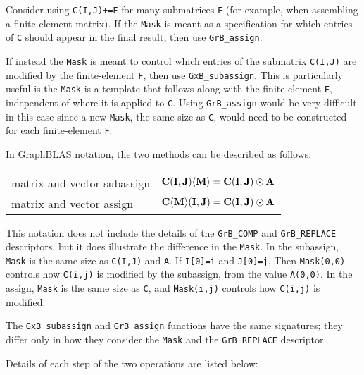 \documentclass[12pt]{article}
\begin{document}
{Consider using \verb'C(I,J)+=F' for many submatrices \verb'F' (for example,
when assembling a finite-element matrix).  If the \verb'Mask' is meant as a
specification for which entries of \verb'C' should appear in the final result,
then use \verb'GrB_assign'.

If instead the \verb'Mask' is meant to control which entries of the submatrix
\verb'C(I,J)' are modified by the finite-element \verb'F', then use
\verb'GxB_subassign'.  This is particularly useful is the \verb'Mask' is a
template that follows along with the finite-element \verb'F', independent of
where it is applied to \verb'C'.  Using \verb'GrB_assign' would be very
difficult in this case since a new \verb'Mask', the same size as \verb'C',
would need to be constructed for each finite-element \verb'F'.

In GraphBLAS notation, the two methods can be described as follows:

\vspace{0.05in}
\begin{tabular}{ll}
\hline
matrix and vector subassign & ${\bf C(I,J) \langle M \rangle}  = {\bf C(I,J)} \odot {\bf A}$ \\
matrix and vector    assign & ${\bf C \langle M \rangle (I,J)} = {\bf C(I,J)} \odot {\bf A}$ \\
\hline
\end{tabular}
\vspace{0.05in}

This notation does not include the details of the \verb'GrB_COMP' and
\verb'GrB_REPLACE' descriptors, but it does illustrate the difference in the
\verb'Mask'.  In the subassign, \verb'Mask' is the same size as \verb'C(I,J)'
and \verb'A'.  If \verb'I[0]=i' and \verb'J[0]=j', Then \verb'Mask(0,0)'
controls how \verb'C(i,j)' is modified by the subassign, from the value
\verb'A(0,0)'.  In the assign, \verb'Mask' is the same size as \verb'C', and
\verb'Mask(i,j)' controls how \verb'C(i,j)' is modified.

The \verb'GxB_subassign' and \verb'GrB_assign' functions have the same
signatures; they differ only in how they consider the \verb'Mask' and the
\verb'GrB_REPLACE' descriptor

Details of each step of the two operations are listed below:

}
\end{document}

